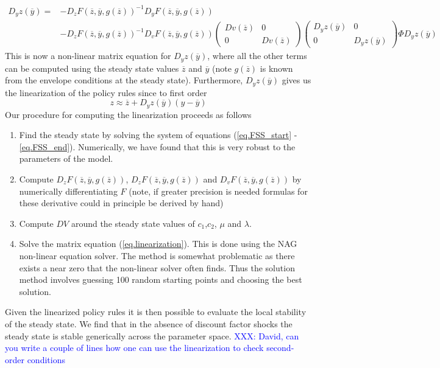 \documentclass[thmsb,11pt]{article}
\newcommand{\bmat}{\begin{matrix}}
\newcommand{\emat}{\end{matrix}}
\newcommand{\ov}{\overline}
\begin{document}
\begin{align}
	D_y z(\ov y) =& -D_z F(\ov z,\ov y, g(\ov z))^{-1}D_yF(\ov z,\ov y,g(\ov z))\nonumber\\
	& - D_zF(\ov z,\ov y,g(\ov z))^{-1} D_v F(\ov z, \ov y, g(\ov z))\left(\bmat Dv(\ov z) &0\\0& D v(\ov z)\emat\right)\left(\bmat D_y z(\ov y) &0\\0&D_y z(\ov y)\emat\right)\Phi D_y z(\ov y) \label{eq.linearization}
\end{align}  This is now a non-linear matrix equation for $D_y z(\ov y)$,  where all the other terms can be computed using the steady state values $\ov z$ and $\ov y$ (note $g(\ov z)$ is known from the envelope conditions at the steady state).  Furthermore, $D_y z(\ov y)$ gives us the linearization of the policy rules since to first order
\[
	z \approx \ov z + D_y z(\ov y)(y-\ov y)
\]Our procedure for computing the linearization proceeds as follows
	\begin{enumerate}
		\item Find the steady state by solving the system of equations (\ref{eq.FSS_start} - \ref{eq.FSS_end}).  Numerically, we have found that this is very robust to the parameters of the model.
		\item  Compute $D_zF(\ov z,\ov y,g(\ov z))$, $D_zF(\ov z,\ov y,g(\ov z))$ and $D_vF(\ov z,\ov y,g(\ov z))$ by numerically differentiating $F$ (note, if greater precision is needed formulas for these derivative could in principle be derived by hand)
		\item  Compute $DV$ around the steady state values of $c_1$,$c_2$, $\mu$ and $\lambda$.
		\item  Solve the matrix equation (\ref{eq.linearization}).  This is done using the NAG non-linear equation solver.   The method is somewhat problematic as there exists a near zero that the non-linear solver often finds.  Thus the solution method involves guessing 100 random starting points and choosing the best solution.
	\end{enumerate}
Given the linearized policy rules it is then possible to evaluate the local stability of the steady state.  We find that in the absence of discount factor shocks the steady state is stable generically across the parameter space.
\textcolor{blue}{XXX: David, can you write a couple of lines how one can use the linearization to check second-order conditions}
\end{document}
